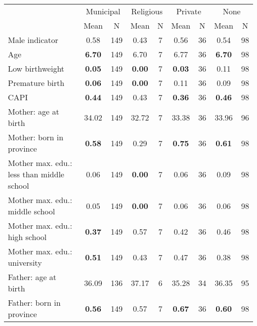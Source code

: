 \begin{tabular}{l c c c c c c c c}
\toprule
& \multicolumn{2}{c}{Municipal} & \multicolumn{2}{c}{Religious} & \multicolumn{2}{c}{Private} & \multicolumn{2}{c}{None} \\
& \scriptsize Mean & \scriptsize N & \scriptsize Mean & \scriptsize N & \scriptsize Mean & \scriptsize N & \scriptsize Mean & \scriptsize N \\
\midrule
Male indicator &      0.58 &       149 &      0.43 &         7 &      0.56 &        36 &      0.54 &        98 \\
Age & \textbf{     6.70} &       149 &      6.70 &         7 &      6.77 &        36 & \textbf{     6.70} &        98 \\
Low birthweight & \textbf{     0.05} &       149 & \textbf{     0.00} &         7 & \textbf{     0.03} &        36 &      0.11 &        98 \\
Premature birth & \textbf{     0.06} &       149 & \textbf{     0.00} &         7 &      0.11 &        36 &      0.09 &        98 \\
CAPI & \textbf{     0.44} &       149 &      0.43 &         7 & \textbf{     0.36} &        36 & \textbf{     0.46} &        98 \\
Mother: age at birth &     34.02 &       149 &     32.72 &         7 &     33.38 &        36 &     33.96 &        96 \\
Mother: born in province & \textbf{     0.58} &       149 &      0.29 &         7 & \textbf{     0.75} &        36 & \textbf{     0.61} &        98 \\
Mother max. edu.: less than middle school &      0.06 &       149 & \textbf{     0.00} &         7 &      0.06 &        36 &      0.09 &        98 \\
Mother max. edu.: middle school &      0.05 &       149 & \textbf{     0.00} &         7 &      0.06 &        36 &      0.06 &        98 \\
Mother max. edu.: high school & \textbf{     0.37} &       149 &      0.57 &         7 &      0.42 &        36 &      0.46 &        98 \\
Mother max. edu.: university & \textbf{     0.51} &       149 &      0.43 &         7 &      0.47 &        36 &      0.38 &        98 \\
Father: age at birth &     36.09 &       136 &     37.17 &         6 &     35.28 &        34 &     36.35 &        95 \\
Father: born in province & \textbf{     0.56} &       149 &      0.57 &         7 & \textbf{     0.67} &        36 & \textbf{     0.60} &        98 \\

\end{tabular}
